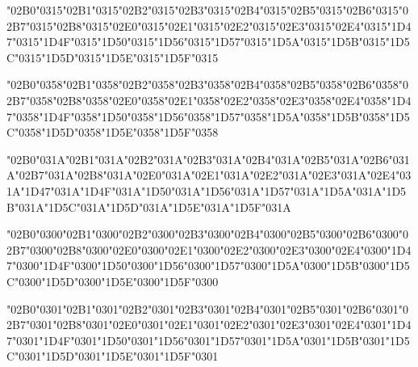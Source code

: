 \documentclass[landscape]{article}
\newcommand{\gs}{\hspace{0.5mm}}	%
\begin{document}
{\Gentium
\char"02B0\char"0315\gs \char"02B1\char"0315\gs \char"02B2\char"0315\gs \char"02B3\char"0315\gs \char"02B4\char"0315\gs \char"02B5\char"0315\gs \char"02B6\char"0315\gs \char"02B7\char"0315\gs \char"02B8\char"0315\gs \char"02E0\char"0315\gs \char"02E1\char"0315\gs \char"02E2\char"0315\gs \char"02E3\char"0315\gs \char"02E4\char"0315\gs \char"1D47\char"0315\gs \char"1D4F\char"0315\gs \char"1D50\char"0315\gs \char"1D56\char"0315\gs \char"1D57\char"0315\gs \char"1D5A\char"0315\gs \char"1D5B\char"0315\gs \char"1D5C\char"0315\gs \char"1D5D\char"0315\gs \char"1D5E\char"0315\gs \char"1D5F\char"0315

\char"02B0\char"0358\gs \char"02B1\char"0358\gs \char"02B2\char"0358\gs \char"02B3\char"0358\gs \char"02B4\char"0358\gs \char"02B5\char"0358\gs \char"02B6\char"0358\gs \char"02B7\char"0358\gs \char"02B8\char"0358\gs \char"02E0\char"0358\gs \char"02E1\char"0358\gs \char"02E2\char"0358\gs \char"02E3\char"0358\gs \char"02E4\char"0358\gs \char"1D47\char"0358\gs \char"1D4F\char"0358\gs \char"1D50\char"0358\gs \char"1D56\char"0358\gs \char"1D57\char"0358\gs \char"1D5A\char"0358\gs \char"1D5B\char"0358\gs \char"1D5C\char"0358\gs \char"1D5D\char"0358\gs \char"1D5E\char"0358\gs \char"1D5F\char"0358

\char"02B0\char"031A\gs \char"02B1\char"031A\gs \char"02B2\char"031A\gs \char"02B3\char"031A\gs \char"02B4\char"031A\gs \char"02B5\char"031A\gs \char"02B6\char"031A\gs \char"02B7\char"031A\gs \char"02B8\char"031A\gs \char"02E0\char"031A\gs \char"02E1\char"031A\gs \char"02E2\char"031A\gs \char"02E3\char"031A\gs \char"02E4\char"031A\gs \char"1D47\char"031A\gs \char"1D4F\char"031A\gs \char"1D50\char"031A\gs \char"1D56\char"031A\gs \char"1D57\char"031A\gs \char"1D5A\char"031A\gs \char"1D5B\char"031A\gs \char"1D5C\char"031A\gs \char"1D5D\char"031A\gs \char"1D5E\char"031A\gs \char"1D5F\char"031A

\char"02B0\char"0300\gs \char"02B1\char"0300\gs \char"02B2\char"0300\gs \char"02B3\char"0300\gs \char"02B4\char"0300\gs \char"02B5\char"0300\gs \char"02B6\char"0300\gs \char"02B7\char"0300\gs \char"02B8\char"0300\gs \char"02E0\char"0300\gs \char"02E1\char"0300\gs \char"02E2\char"0300\gs \char"02E3\char"0300\gs \char"02E4\char"0300\gs \char"1D47\char"0300\gs \char"1D4F\char"0300\gs \char"1D50\char"0300\gs \char"1D56\char"0300\gs \char"1D57\char"0300\gs \char"1D5A\char"0300\gs \char"1D5B\char"0300\gs \char"1D5C\char"0300\gs \char"1D5D\char"0300\gs \char"1D5E\char"0300\gs \char"1D5F\char"0300

\char"02B0\char"0301\gs \char"02B1\char"0301\gs \char"02B2\char"0301\gs \char"02B3\char"0301\gs \char"02B4\char"0301\gs \char"02B5\char"0301\gs \char"02B6\char"0301\gs \char"02B7\char"0301\gs \char"02B8\char"0301\gs \char"02E0\char"0301\gs \char"02E1\char"0301\gs \char"02E2\char"0301\gs \char"02E3\char"0301\gs \char"02E4\char"0301\gs \char"1D47\char"0301\gs \char"1D4F\char"0301\gs \char"1D50\char"0301\gs \char"1D56\char"0301\gs \char"1D57\char"0301\gs \char"1D5A\char"0301\gs \char"1D5B\char"0301\gs \char"1D5C\char"0301\gs \char"1D5D\char"0301\gs \char"1D5E\char"0301\gs \char"1D5F\char"0301

}
\end{document}
